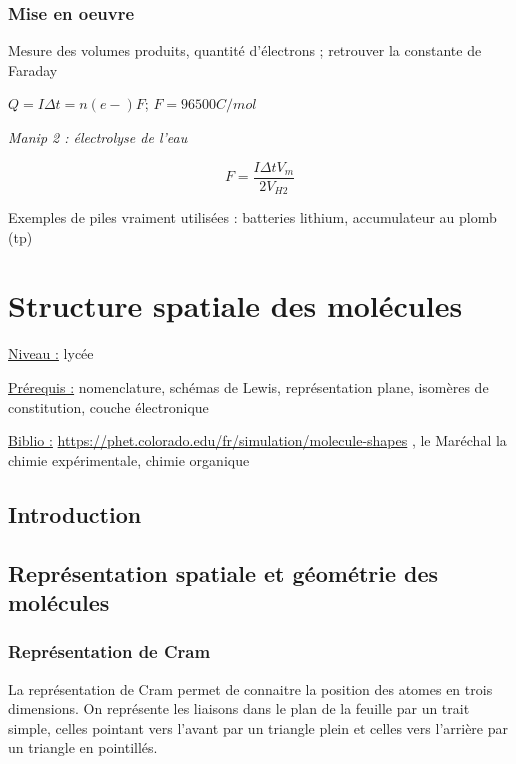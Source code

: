 \documentclass{article}%
\begin{document}
\subsubsection{Mise en oeuvre}
Mesure des volumes produits, quantité d'électrons ; retrouver la constante de Faraday

$Q=I \Delta t = n(e-)F$; $F=96500C/mol$

\textit{Manip 2 : électrolyse de l'eau}

\[F=\frac{I \Delta t V_m}{2 V_{H2}}\]

Exemples de piles vraiment utilisées : batteries lithium, accumulateur au plomb (tp)
\section{Structure spatiale des molécules}
\underline{Niveau :} lycée

\underline{Prérequis :} nomenclature, schémas de Lewis, représentation plane, isomères de constitution, couche électronique

\underline{Biblio :} \url{https://phet.colorado.edu/fr/simulation/molecule-shapes} , le Maréchal la chimie expérimentale, chimie organique

\subsection{Introduction}

\subsection{Représentation spatiale et géométrie des molécules}
\subsubsection{Représentation de Cram}

La représentation de Cram permet de connaitre la position des atomes en trois dimensions. On représente les liaisons dans le plan de la feuille par un trait simple, celles pointant vers l'avant par un triangle plein et celles vers l'arrière par un triangle en pointillés.
\end{document}
